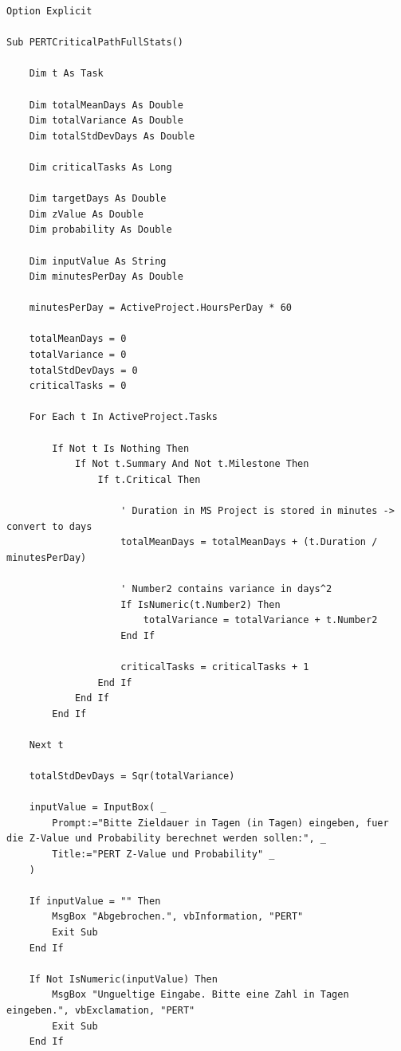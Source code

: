 \begin{lstlisting}[caption={VBA-Makro \texttt{PERTCriticalPathFullStats} fuer Microsoft Project},label={lst:pertcriticalpathfullstats}]
Option Explicit

Sub PERTCriticalPathFullStats()

    Dim t As Task
    
    Dim totalMeanDays As Double
    Dim totalVariance As Double
    Dim totalStdDevDays As Double
    
    Dim criticalTasks As Long
    
    Dim targetDays As Double
    Dim zValue As Double
    Dim probability As Double
    
    Dim inputValue As String
    Dim minutesPerDay As Double
    
    minutesPerDay = ActiveProject.HoursPerDay * 60
    
    totalMeanDays = 0
    totalVariance = 0
    totalStdDevDays = 0
    criticalTasks = 0

    For Each t In ActiveProject.Tasks
    
        If Not t Is Nothing Then
            If Not t.Summary And Not t.Milestone Then
                If t.Critical Then
                    
                    ' Duration in MS Project is stored in minutes -> convert to days
                    totalMeanDays = totalMeanDays + (t.Duration / minutesPerDay)
                    
                    ' Number2 contains variance in days^2
                    If IsNumeric(t.Number2) Then
                        totalVariance = totalVariance + t.Number2
                    End If
                    
                    criticalTasks = criticalTasks + 1
                End If
            End If
        End If
        
    Next t

    totalStdDevDays = Sqr(totalVariance)

    inputValue = InputBox( _
        Prompt:="Bitte Zieldauer in Tagen (in Tagen) eingeben, fuer die Z-Value und Probability berechnet werden sollen:", _
        Title:="PERT Z-Value und Probability" _
    )
    
    If inputValue = "" Then
        MsgBox "Abgebrochen.", vbInformation, "PERT"
        Exit Sub
    End If
    
    If Not IsNumeric(inputValue) Then
        MsgBox "Ungueltige Eingabe. Bitte eine Zahl in Tagen eingeben.", vbExclamation, "PERT"
        Exit Sub
    End If
    

\end{lstlisting}
